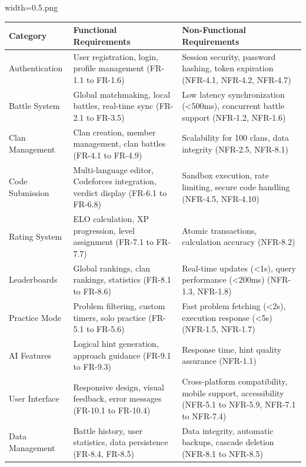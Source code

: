 width=0.5\linewidthimage.png\documentclass[12pt,a4paper]{article}
\begin{document}
\begin{longtable}{|p{3cm}|p{5cm}|p{5cm}|}
\hline
\textbf{Category} & \textbf{Functional Requirements} & \textbf{Non-Functional Requirements} \\
\hline
\endhead

Authentication & User registration, login, profile management (FR-1.1 to FR-1.6) & Session security, password hashing, token expiration (NFR-4.1, NFR-4.2, NFR-4.7) \\
\hline

Battle System & Global matchmaking, local battles, real-time sync (FR-2.1 to FR-3.5) & Low latency synchronization (<500ms), concurrent battle support (NFR-1.2, NFR-1.6) \\
\hline

Clan Management & Clan creation, member management, clan battles (FR-4.1 to FR-4.9) & Scalability for 100 clans, data integrity (NFR-2.5, NFR-8.1) \\
\hline

Code Submission & Multi-language editor, Codeforces integration, verdict display (FR-6.1 to FR-6.8) & Sandbox execution, rate limiting, secure code handling (NFR-4.5, NFR-4.10) \\
\hline

Rating System & ELO calculation, XP progression, level assignment (FR-7.1 to FR-7.7) & Atomic transactions, calculation accuracy (NFR-8.2) \\
\hline

Leaderboards & Global rankings, clan rankings, statistics (FR-8.1 to FR-8.6) & Real-time updates (<1s), query performance (<200ms) (NFR-1.3, NFR-1.8) \\
\hline

Practice Mode & Problem filtering, custom timers, solo practice (FR-5.1 to FR-5.6) & Fast problem fetching (<2s), execution response (<5s) (NFR-1.5, NFR-1.7) \\
\hline

AI Features & Logical hint generation, approach guidance (FR-9.1 to FR-9.3) & Response time, hint quality assurance (NFR-1.1) \\
\hline

User Interface & Responsive design, visual feedback, error messages (FR-10.1 to FR-10.4) & Cross-platform compatibility, mobile support, accessibility (NFR-5.1 to NFR-5.9, NFR-7.1 to NFR-7.4) \\
\hline

Data Management & Battle history, user statistics, data persistence (FR-8.4, FR-8.5) & Data integrity, automatic backups, cascade deletion (NFR-8.1 to NFR-8.5) \\
\hline


\end{longtable}
\end{document}
